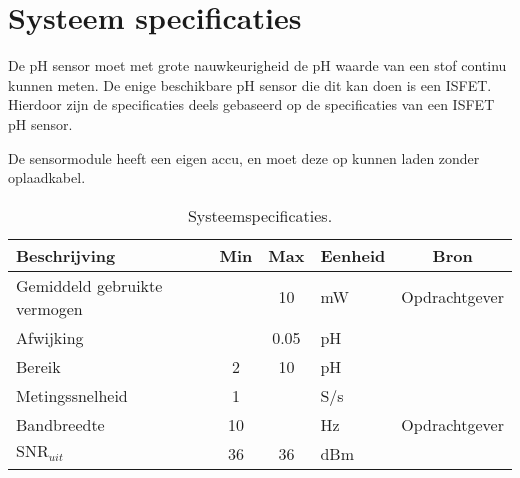 \section{Systeem specificaties}
De pH sensor moet met grote nauwkeurigheid de pH waarde van een stof continu kunnen meten. 
De enige beschikbare pH sensor die dit kan doen is een ISFET.
Hierdoor zijn de specificaties deels gebaseerd op de specificaties van een ISFET pH sensor.

De sensormodule heeft een eigen accu, en moet deze op kunnen laden zonder oplaadkabel.

\begin{table}[ht]
    \centering
    \begin{tabular}{|l|c c|l|c|}
        \hline
        Beschrijving                 & Min & Max  & Eenheid   & Bron \\
        \hline 
        Gemiddeld gebruikte vermogen &     & 10   & mW        & Opdrachtgever \\
        Afwijking                    &     & 0.05 & pH        & \cite{isfet} \\ 
        Bereik                       & 2   & 10   & pH        & \cite{isfet} \\
        Metingssnelheid              & 1   &      & S/s       & \cite{isfet} \\
        Bandbreedte                  & 10  &      & Hz        & Opdrachtgever\\
        $\mathrm{SNR}_{uit}$         & 36  & 36   & dBm       &  \\
        \hline
    \end{tabular}
    \caption{Systeemspecificaties.}
    \label{tab:systemSpecs}
\end{table}




